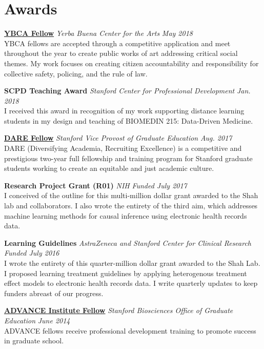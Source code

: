 
\section{\mysidestyle Awards} 

    \href{https://www.ybca.org/ybca-fellows}
  {\textbf{YBCA Fellow}}
   \textsl{Yerba Buena Center for the Arts} 
    \hfill \textsl{May 2018} \\
    {\small YBCA fellows are accepted through a competitive application and meet throughout the year to create public works of art addressing critical social themes. My work focuses on creating citizen accountability and responsibility for collective safety, policing, and the rule of law.}
    
  {\textbf{SCPD Teaching Award}}
   \textsl{Stanford Center for Professional Development} 
    \hfill \textsl{Jan. 2018} \\
    {\small I received this award in recognition of my work supporting distance learning students in my design and teaching of BIOMEDIN 215: Data-Driven Medicine.}    

    \href{https://vpge.stanford.edu/fellowships-funding/dare}
  {\textbf{DARE Fellow}}
   \textsl{Stanford Vice Provost of Graduate Education} 
    \hfill \textsl{Aug. 2017} \\ 
    {\small DARE (Diversifying Academia, Recruiting Excellence) is a competitive and prestigious two-year full fellowship and training program for Stanford graduate students working to create an equitable and just academic culture.}

 \textbf{Research Project Grant (R01)}
   \textsl{NIH} 
    \hfill \textsl{Funded July 2017} \\ 
    {\small I conceived of the outline for this multi-million dollar grant awarded to the Shah lab and collaborators. I also wrote the entirety of the third aim, which addresses machine learning methods for causal inference using electronic health records data.}

 \textbf{Learning Guidelines}
   \textsl{AstraZeneca and Stanford Center for Clinical Research} 
    \hfill \textsl{Funded July 2016} \\ 
    {\small I wrote the entirety of this quarter-million dollar grant awarded to the Shah Lab. I proposed learning treatment guidelines by applying heterogenous treatment effect models to electronic health records data. I write quarterly updates to keep funders abreast of our progress.}

	\href{https://biosciences.stanford.edu/current/diversity/advance/}
	{\textbf{ADVANCE Institute Fellow}}
   \textsl{Stanford Biosciences Office of Graduate Education} 
    \hfill \textsl{June 2014} \\ 
 {\small ADVANCE fellows receive professional development training to promote success in graduate school.}